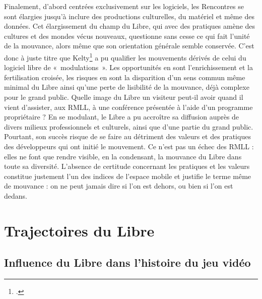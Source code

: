 \documentclass{FramateX}
\begin{document}
\begin{refsection}
Finalement, d'abord centrées exclusivement sur les logiciels, les
Rencontres se sont élargies jusqu'à inclure des productions
culturelles, du matériel et même des données. Cet élargissement du
champ du Libre, qui avec des pratiques amène des cultures et des mondes
vécus nouveaux, questionne sans cesse ce qui fait l'unité de la
mouvance, alors même que son orientation générale semble conservée.
C'est donc à juste titre que
Kelty\footnote{\cite{keltytwo2008}.} a pu qualifier les mouvements dérivés de celui du logiciel libre de «~modulations~». Les opportunités en sont l'enrichissement et
la fertilisation croisée, les risques en sont la disparition d'un sens
commun même minimal du Libre ainsi qu'une perte de lisibilité de la
mouvance, déjà complexe pour le grand public. Quelle image du Libre un
visiteur peut-il avoir quand il vient d'assister, aux RMLL, à une
conférence présentée à l'aide d'un programme propriétaire ? En se
modulant, le Libre a pu accroître sa diffusion auprès de divers milieux
professionnels et culturels, ainsi que d'une partie du grand public.
Pourtant, son succès risque de se faire au détriment des valeurs et des
pratiques des développeurs qui ont initié le mouvement. Ce n'est pas un
échec des RMLL : elles ne font que rendre visible, en la condensant, la
mouvance du Libre dans toute sa diversité. L'absence de certitude
concernant les pratiques et les valeurs constitue justement l'un des
indices de l'espace mobile et justifie le terme même de mouvance : on
ne peut jamais dire si l'on est dehors, ou bien si l'on est dedans.






                    
\printbibliography[heading=subbibliography]
\end{refsection} 



%
%
\part{Trajectoires du Libre}
%
%
\chapter*{Influence du Libre dans l'histoire du jeu vidéo}   
{}
\end{document}
